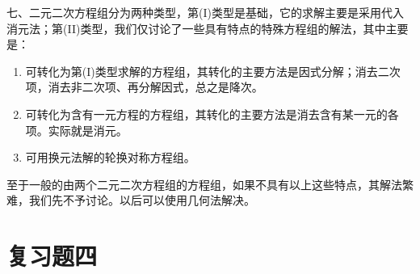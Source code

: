     七、二元二次方程组分为两种类型，第(I)类型是基础，它的求解主要是采用代入消元法；第(II)类型，我们仅讨论了一些具有特点的特殊方程组的解法，其中主要是：
    \begin{enumerate}
        \item 可转化为第(I)类型求解的方程组，其转化的主要方法是因式分解；消去二次项，消去非二次项、再分解因式，总之是降次。
        \item 可转化为含有一元方程的方程组，其转化的主要方法是消去含有某一元的各项。实际就是消元。
        \item 可用换元法解的轮换对称方程组。
\end{enumerate}

至于一般的由两个二元二次方程组的方程组，如果不具有以上这些特点，其解法繁难，我们先不予讨论。以后可以使用几何法解决。


\section*{复习题四}
